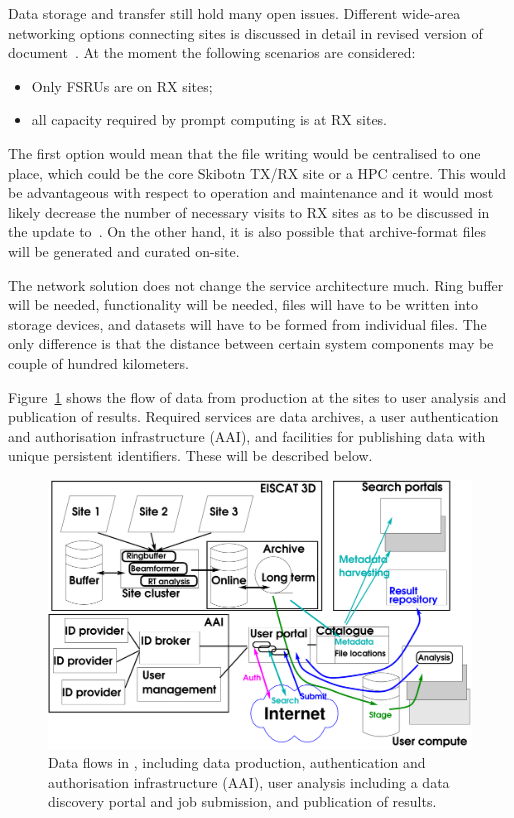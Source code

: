 \documentclass[12pt,a4paper]{article}
\begin{document}

Data storage and transfer still hold many open issues. 
Different wide-area networking options connecting sites is discussed in detail in revised version of document~\cite{e3dds-del1}. 
At the moment the following scenarios are considered:
\begin{itemize}
    \item Only FSRUs are on RX sites; 
    \item all capacity required by prompt computing is at RX sites.
\end{itemize}
The first option would mean that the file writing would be centralised to one place, which could be the core Skibotn TX/RX site or a HPC centre.
This would be  advantageous with respect to operation and maintenance and it would most likely decrease the number of necessary visits to RX sites as to be discussed in the update to~\cite{e3dds-del1}.
On the other hand, it is also possible that archive-format files will be generated and curated on-site. 

The network solution does not change the service architecture much. 
Ring buffer will be needed, \SBF{} functionality will be needed, files will have to be written into storage devices, and datasets will have to be formed from individual files. The only difference is that the distance between certain system components may be couple of hundred kilometers.

Figure~\ref{fig:dataflow-overall} shows the flow of data from production at the sites to user analysis and publication of results. 
Required services are data archives, a user authentication and authorisation infrastructure (AAI), and facilities for publishing data with unique persistent identifiers. These will be described below. 
\begin{figure}
    \centering
    \includegraphics[width=\linewidth]{E3DDS-D2-dataflow.pdf}
    \caption{Data flows in \ED, including data production, authentication and authorisation infrastructure (AAI), user analysis including a data discovery portal and job submission, and publication of results.
    \label{fig:dataflow-overall}}
\end{figure}
\end{document}
